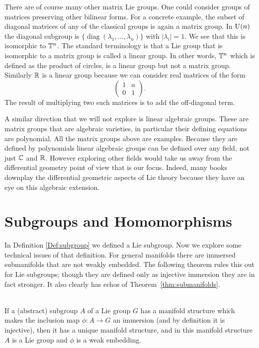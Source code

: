 There are of course many other matrix Lie groups.
One could consider groups of matrices preserving other bilinear forms. 
For a concrete example, the subset of diagonal matrices of any of the classical groups is again a matrix group.
In $\mathrm{U}(n)$ the diagonal subgroup is $\{\operatorname{diag}(\lambda_1,\dots,\lambda_n)\}$ with $|\lambda_i| = 1$.
We see that this is isomorphic to $\mathbb{T}^n$.
The standard terminology is that a Lie group that is isomorphic to a matrix group is called a linear group.
In other words, $\mathbb{T}^n$ which is defined as the product of circles, is a linear group but not a matrix group.
Similarly $\mathbb{R}$ is a linear group because we can consider real matrices of the form
\[
\begin{pmatrix}
1 & a \\
0 & 1
\end{pmatrix}.
\]
The result of multiplying two such matrices is to add the off-diagonal term.

A similar direction that we will not explore is linear algebraic groups.
These are matrix groups that are algebraic varieties, in particular their defining equations are polynomial.
All the matrix groups above are examples.
Because they are defined by polynomials linear algebraic groups can be defined over any field, not just $\mathbb{C}$ and $\mathbb{R}$.
However exploring other fields would take us away from the differential geometry point of view that is our focus.
Indeed, many books downplay the differential geometric aspects of Lie theory because they have an eye on this algebraic extension.






\section{Subgroups and Homomorphisms}
\label{sec:subgroups}
In Definition \ref{Def:subgroup} we defined a Lie subgroup.
Now we explore some technical issues of that definition.
For general manifolds there are immersed submanifolds that are not weakly embedded. 
The following theorem rules this out for Lie subgroups; though they are defined only as injective immersion they are in fact stronger.
It also clearly has echos of Theorem~\ref{thm:submanifolds}.

\begin{theorem}
\label{thm:subgroup weakly embedded}
\textup{\cite[3.20]{Warner1983}}\\
If a (abstract) subgroup $A$ of a Lie group $G$ has a manifold structure which makes the inclusion map $\phi: A \to G$ an immersion (and by definition it is injective), then it has a unique manifold structure, and in this manifold structure $A$ is a Lie group and $\phi$ is a weak embedding.
\end{theorem}


